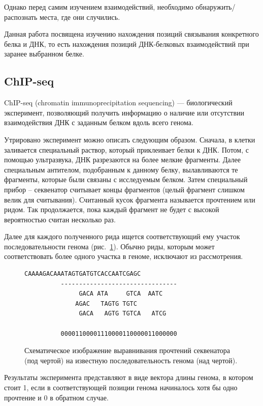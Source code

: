 \documentclass{matmex-diploma-custom}
\begin{document}
Однако перед самим изучением взаимодействий, необходимо обнаружить/распознать места, где они случились.

Данная работа посвящена изучению нахождения позиций связывания конкретного белка и ДНК, то есть нахождения позиций ДНК-белковых взаимодействий при заранее выбранном белке.

\subsection*{ChIP-seq}
ChIP-seq (chromatin immunoprecipitation sequencing) --- биологический эксперимент, позволяющий получить информацию о наличие или отсутствии
взаимодействия ДНК с заданным белком вдоль всего генома.

Утрировано эксперимент можно описать следующим образом. Сначала, в клетки заливается специальный раствор, который приклеивает белки к ДНК. Потом, с помощью ультразвука, ДНК разрезаются на более мелкие фрагменты. Далее специальным антителом, подобранным к данному белку, вылавливаются те фрагменты, которые были связаны с исследуемым белком. Затем специальный прибор -- секвенатор считывает концы фрагментов (целый фрагмент слишком велик для считывания). Считанный кусок фрагмента называется прочтением или ридом. 
Так продолжается, пока каждый фрагмент не будет с высокой вероятностью считан несколько раз.

Далее для каждого полученного рида ищется соответствующий
ему участок последовательности генома (рис.~\ref{fig:chip-seq}). Обычно
риды, которым может соответствовать более одного участка в геноме,
исключают из рассмотрения.

\begin{figure}[h]
  \centering

\begin{Verbatim}[commandchars=\\\{\}]
          CAAAAGACAAATAGTGATGTCACCAATCGAGC
          --------------------------------
               GACA ATA     GTCA  AATC
              AGAC   TAGTG TGTC
               GACA   AGTG TGTCA   ATCG

          00001100001110000110000011000000
\end{Verbatim}
  \caption{Схематическое изображение выравнивания прочтений секвенатора (под чертой)
    на известную последовательность генома (над чертой).}
  \label{fig:chip-seq}
\end{figure}

Результаты эксперимента представляют в виде вектора длины генома, в котором
стоит 1, если в соответствующей позиции генома начиналось хотя бы одно прочтение
и 0 в обратном случае.
\end{document}
